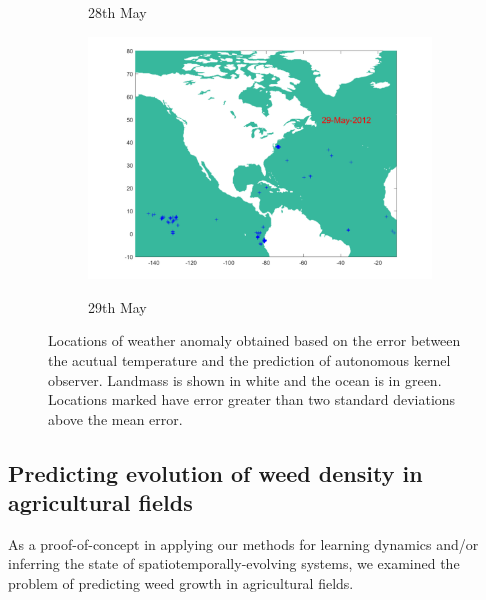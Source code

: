 \documentclass[letterpaper,12pt,peerreviewca,draftcls]{IEEEtran}
\begin{document}
\begin{figure}
\begin{subfigure}[t]{0.49\textwidth}
		\label{fig:May28}
		\caption{28th May}
	\end{subfigure}
	\begin{subfigure}[t]{0.49\textwidth}
		\includegraphics[width=\linewidth]{"Figure 14d"}
		\label{fig:May29}
		\caption{29th May}
	\end{subfigure}
	\caption{Locations of weather anomaly obtained based on the error between the acutual temperature and the prediction of autonomous kernel observer. Landmass is shown in white and the ocean is in green. Locations marked have error greater than two standard deviations above the mean error. }
	\label{fig:anomaly}
\end{figure}



\subsection{Predicting evolution of weed density in agricultural fields}\label{sec:weed}

As a proof-of-concept in applying our methods for learning dynamics and/or inferring the state of spatiotemporally-evolving systems, we examined the problem of predicting weed growth in agricultural fields.
\end{document}
